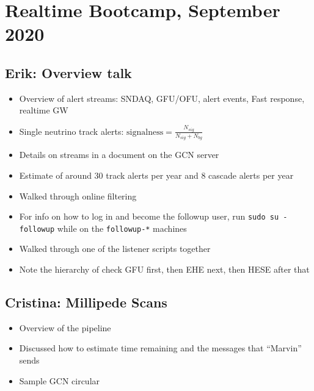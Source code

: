 \chapter{Realtime Bootcamp, September 2020}

\section{Erik: Overview talk}
\begin{itemize}
    \item Overview of alert streams: SNDAQ, GFU/OFU, alert events, Fast response, realtime GW
    \item Single neutrino track alerts: $\mathrm{signalness} = \frac{N_{sig}}{N_{sig} + N_{bg}}$
    \item Details on streams in a document on the GCN server
    \item Estimate of around 30 track alerts per year and 8 cascade alerts per year
    \item Walked through online filtering
    \item For info on how to log in and become the followup user, run \texttt{sudo su - followup} while on the \texttt{followup-*} machines
    \item Walked through one of the listener scripts together
    \item Note the hierarchy of check GFU first, then EHE next, then HESE after that
\end{itemize}

\section{Cristina: Millipede Scans}
\begin{itemize}
    \item Overview of the pipeline
    \item Discussed how to estimate time remaining and the messages that ``Marvin'' sends
    \item Sample GCN circular
\end{itemize}